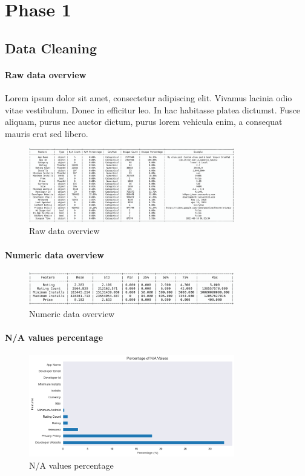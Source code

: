 \section{Phase 1}
\subsection*{Data Cleaning}

\paragraph{Raw data overview}
Lorem ipsum dolor sit amet, consectetur adipiscing elit. Vivamus lacinia odio vitae vestibulum. Donec in efficitur leo. In hac habitasse platea dictumst. Fusce aliquam, purus nec auctor dictum, purus lorem vehicula enim, a consequat mauris erat sed libero.

\begin{figure}[h]
\centering
\includegraphics[width=0.8\textwidth]{docs//assets/raw-data-overview.png}
\caption{Raw data overview}
\end{figure}

\paragraph{Numeric data overview}

\begin{figure}[h]
\centering
\includegraphics[width=0.8\textwidth]{docs//assets/numeric-data-overview.png}
\caption{Numeric data overview}
\end{figure}

\paragraph{N/A values percentage}

\begin{figure}[h]
\centering
\includegraphics[width=0.8\textwidth]{docs//assets/percentage_na.png}
\caption{N/A values percentage}
\end{figure}


